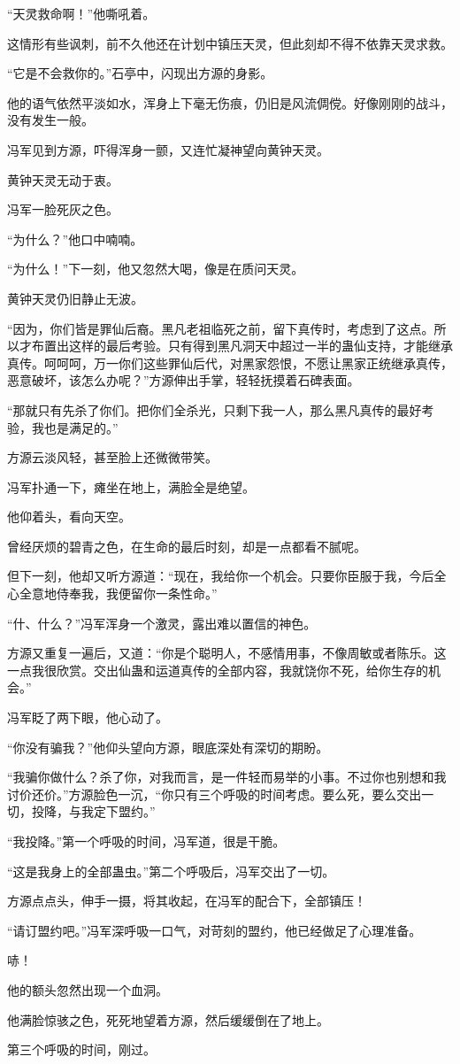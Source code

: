 \begin{this_body}
“天灵救命啊！”他嘶吼着。

这情形有些讽刺，前不久他还在计划中镇压天灵，但此刻却不得不依靠天灵求救。

“它是不会救你的。”石亭中，闪现出方源的身影。

他的语气依然平淡如水，浑身上下毫无伤痕，仍旧是风流倜傥。好像刚刚的战斗，没有发生一般。

冯军见到方源，吓得浑身一颤，又连忙凝神望向黄钟天灵。

黄钟天灵无动于衷。

冯军一脸死灰之色。

“为什么？”他口中喃喃。

“为什么！”下一刻，他又忽然大喝，像是在质问天灵。

黄钟天灵仍旧静止无波。

“因为，你们皆是罪仙后裔。黑凡老祖临死之前，留下真传时，考虑到了这点。所以才布置出这样的最后考验。只有得到黑凡洞天中超过一半的蛊仙支持，才能继承真传。呵呵呵，万一你们这些罪仙后代，对黑家怨恨，不愿让黑家正统继承真传，恶意破坏，该怎么办呢？”方源伸出手掌，轻轻抚摸着石碑表面。

“那就只有先杀了你们。把你们全杀光，只剩下我一人，那么黑凡真传的最好考验，我也是满足的。”

方源云淡风轻，甚至脸上还微微带笑。

冯军扑通一下，瘫坐在地上，满脸全是绝望。

他仰着头，看向天空。

曾经厌烦的碧青之色，在生命的最后时刻，却是一点都看不腻呢。

但下一刻，他却又听方源道：“现在，我给你一个机会。只要你臣服于我，今后全心全意地侍奉我，我便留你一条性命。”

“什、什么？”冯军浑身一个激灵，露出难以置信的神色。

方源又重复一遍后，又道：“你是个聪明人，不感情用事，不像周敏或者陈乐。这一点我很欣赏。交出仙蛊和运道真传的全部内容，我就饶你不死，给你生存的机会。”

冯军眨了两下眼，他心动了。

“你没有骗我？”他仰头望向方源，眼底深处有深切的期盼。

“我骗你做什么？杀了你，对我而言，是一件轻而易举的小事。不过你也别想和我讨价还价。”方源脸色一沉，“你只有三个呼吸的时间考虑。要么死，要么交出一切，投降，与我定下盟约。”

“我投降。”第一个呼吸的时间，冯军道，很是干脆。

“这是我身上的全部蛊虫。”第二个呼吸后，冯军交出了一切。

方源点点头，伸手一摄，将其收起，在冯军的配合下，全部镇压！

“请订盟约吧。”冯军深呼吸一口气，对苛刻的盟约，他已经做足了心理准备。

哧！

他的额头忽然出现一个血洞。

他满脸惊骇之色，死死地望着方源，然后缓缓倒在了地上。

第三个呼吸的时间，刚过。

\end{this_body}

